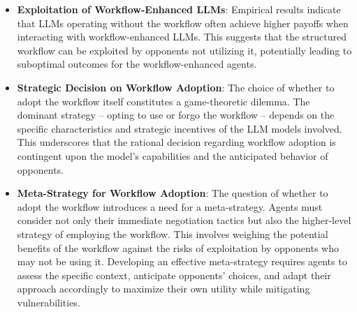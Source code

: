 \begin{minipage}[t]{1\linewidth} 
\begin{tcolorbox}[colback=gray!5,colframe=blue!40!black,title=Summary for raw-LLM v. workflow-LLM and workflow-LLM v. raw-LLM]
\begin{itemize} 
\item \textbf{Exploitation of Workflow-Enhanced LLMs}: Empirical results indicate that LLMs operating without the workflow often achieve higher payoffs when interacting with workflow-enhanced LLMs. This suggests that the structured workflow can be exploited by opponents not utilizing it, potentially leading to suboptimal outcomes for the workflow-enhanced agents. 
\item \textbf{Strategic Decision on Workflow Adoption}: The choice of whether to adopt the workflow itself constitutes a game-theoretic dilemma. The dominant strategy -- opting to use or forgo the workflow -- depends on the specific characteristics and strategic incentives of the LLM models involved. This underscores that the rational decision regarding workflow adoption is contingent upon the model's capabilities and the anticipated behavior of opponents. 
\item \textbf{Meta-Strategy for Workflow Adoption}: The question of whether to adopt the workflow introduces a need for a meta-strategy. Agents must consider not only their immediate negotiation tactics but also the higher-level strategy of employing the workflow. This involves weighing the potential benefits of the workflow against the risks of exploitation by opponents who may not be using it. Developing an effective meta-strategy requires agents to assess the specific context, anticipate opponents' choices, and adapt their approach accordingly to maximize their own utility while mitigating vulnerabilities.
\end{itemize}
\end{tcolorbox} 
\end{minipage}
